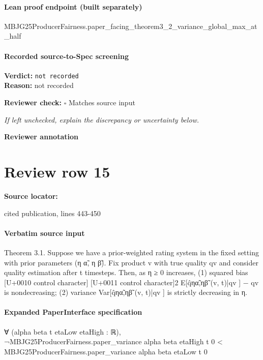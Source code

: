 \documentclass[10pt]{article}
\newcommand{\reviewerbox}{%
  \par\noindent\fbox{\parbox{0.96\linewidth}{\rule{0pt}{0.38in}}}\par
}
\newcommand{\reviewmatch}[1]{%
  \par\noindent\textbf{Reviewer check:} $\square$\; #1\par
  \noindent\emph{If left unchecked, explain the discrepancy or uncertainty below.}\par
}
\begin{document}
\paragraph{Lean proof endpoint (built separately)}\begin{ReviewVerbatim}
MBJG25ProducerFairness.paper_facing_theorem3_2_variance_global_max_at_half
\end{ReviewVerbatim}

\paragraph{Recorded source-to-Spec screening}
\textbf{Verdict:} \texttt{not recorded}
\\
\textbf{Reason:} not recorded
\reviewmatch{Matches source input}
\noindent\textbf{Reviewer annotation}\par
\reviewerbox
\clearpage
\hypertarget{source-claim-6ce0e529b89e57b7}{}
\section*{Review row 15}
\textbf{Source locator:} {\footnotesize\raggedright cited publication, lines 443-\allowbreak{}450\par}
\paragraph{Verbatim source input}
\begin{ReviewVerbatim}
Theorem 3.1. Suppose we have a prior-weighted rating system in the fixed setting with prior parameters (η α̃, η β̃). Fix
product v with true quality qv and consider quality estimation after t timesteps.
Then, as η
≥ 0 increases, (1) squared bias
[U+0010 control character]
[U+0011 control character]2
E[q̂ηα̃,ηβ̃ (v, t)|qv ] − qv
is nondecreasing; (2) variance Var[q̂ηα̃,ηβ̃ (v, t)|qv ] is strictly decreasing in η.
\end{ReviewVerbatim}


\paragraph{Expanded PaperInterface specification}
\begin{ReviewVerbatim}
∀ (alpha beta t etaLow etaHigh : ℝ),
  ¬MBJG25ProducerFairness.paper_variance alpha beta etaHigh t 0 <
      MBJG25ProducerFairness.paper_variance alpha beta etaLow t 0
\end{ReviewVerbatim}
\end{document}
